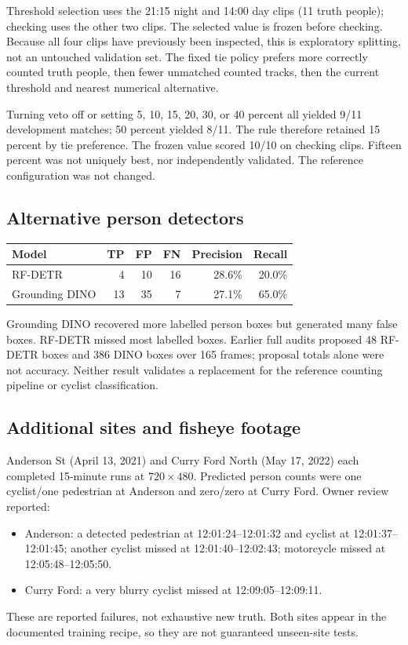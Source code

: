 \documentclass[11pt,letterpaper]{article}
\begin{document}
Threshold selection uses the 21:15 night and 14:00 day clips (11 truth people); checking uses the other two clips. The selected value is frozen before checking. Because all four clips have previously been inspected, this is exploratory splitting, not an untouched validation set. The fixed tie policy prefers more correctly counted truth people, then fewer unmatched counted tracks, then the current threshold and nearest numerical alternative.

Turning veto off or setting 5, 10, 15, 20, 30, or 40 percent all yielded 9/11 development matches; 50 percent yielded 8/11. The rule therefore retained 15 percent by tie preference. The frozen value scored 10/10 on checking clips. Fifteen percent was not uniquely best, nor independently validated. The reference configuration was not changed.

\subsection{Alternative person detectors}
\begin{center}
\begin{tabular}{lrrrrr}
\toprule
Model & TP & FP & FN & Precision & Recall\\
\midrule
RF-DETR &4&10&16&28.6\%&20.0\%\\
Grounding DINO &13&35&7&27.1\%&65.0\%\\
\bottomrule
\end{tabular}
\end{center}
Grounding DINO recovered more labelled person boxes but generated many false boxes. RF-DETR missed most labelled boxes. Earlier full audits proposed 48 RF-DETR boxes and 386 DINO boxes over 165 frames; proposal totals alone were not accuracy. Neither result validates a replacement for the reference counting pipeline or cyclist classification.

\subsection{Additional sites and fisheye footage}
Anderson St (April 13, 2021) and Curry Ford North (May 17, 2022) each completed 15-minute runs at $720\times480$. Predicted person counts were one cyclist/one pedestrian at Anderson and zero/zero at Curry Ford. Owner review reported:
\begin{itemize}
\item Anderson: a detected pedestrian at 12:01:24--12:01:32 and cyclist at 12:01:37--12:01:45; another cyclist missed at 12:01:40--12:02:43; motorcycle missed at 12:05:48--12:05:50.
\item Curry Ford: a very blurry cyclist missed at 12:09:05--12:09:11.
\end{itemize}
These are reported failures, not exhaustive new truth. Both sites appear in the documented training recipe, so they are not guaranteed unseen-site tests.
\end{document}
